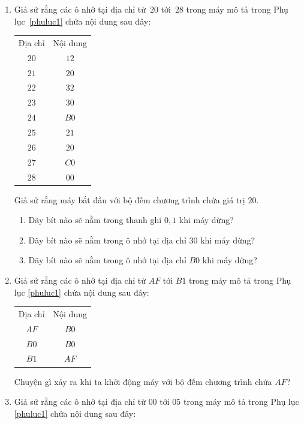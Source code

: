 \begin{multicols}{2}
\begin{enumerate}
  \item Giả sử rằng các ô nhớ tại địa chỉ từ~$20$ tới~$28$ trong máy mô tả trong Phụ
    lục~\ref{phuluc1} chứa nội dung sau đây:

    \begin{tabular}{cc}
      Địa chỉ & Nội dung \\
      $20$    & $12$     \\
      $21$    & $20$     \\
      $22$    & $32$     \\
      $23$    & $30$     \\
      $24$    & $B0$     \\
      $25$    & $21$     \\
      $26$    & $20$     \\
      $27$    & $C0$     \\
      $28$    & $00$     
    \end{tabular}

    Giả sử rằng máy bắt đầu với bộ đếm chương trình chứa giá trị $20$.

    \begin{enumerate}
    \item Dãy bít nào sẽ nằm trong thanh ghi $0, 1$ khi máy dừng?

    \item Dãy bít nào sẽ nằm trong ô nhớ tại địa chỉ $30$ khi máy dừng?

    \item Dãy bít nào sẽ nằm trong ô nhớ tại địa chỉ $B0$ khi máy dừng?
    \end{enumerate}

  \item Giả sử rằng các ô nhớ tại địa chỉ từ $AF$ tới $B1$ trong máy mô tả trong Phụ lục
    \ref{phuluc1} chứa nội dung sau đây:
    \begin{center}
      \begin{tabular}{cc}
        Địa chỉ & Nội dung \\
        $AF$    & $B0$     \\
        $B0$    & $B0$     \\
        $B1$    & $AF$  
      \end{tabular}
    \end{center}
    Chuyện gì xảy ra khi ta khởi động máy với bộ đếm chương trình chứa $AF$?

  \item Giả sử rằng các ô nhớ tại địa chỉ từ $00$ tới $05$ trong máy mô tả trong Phụ lục
    \ref{phuluc1} chứa nội dung sau đây:


\end{enumerate}
\end{multicols}
